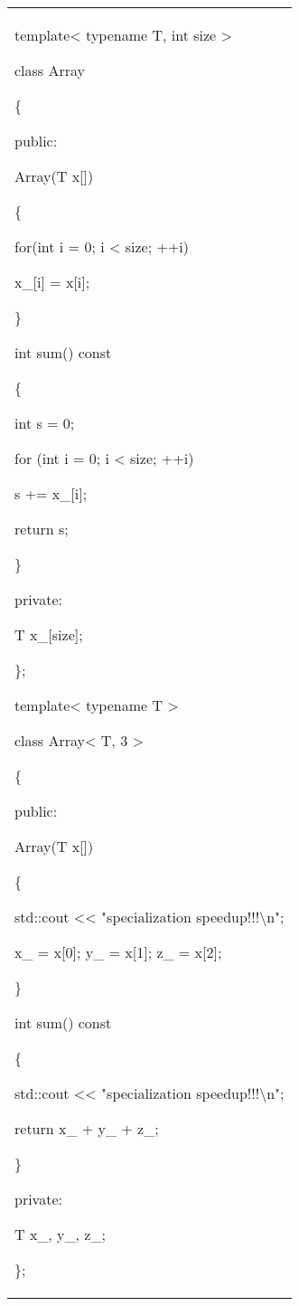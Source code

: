 \documentclass[
]{article}
\begin{document}
\begin{longtable}[]{@{}
  >{\raggedright\arraybackslash}p{}@{}}
\toprule\noalign{}
 \\
\midrule\noalign{}
\endhead
\bottomrule\noalign{}
\endlastfoot
template\textless{} typename T, int size \textgreater{}

class Array

\{

public:

Array(T x{[}{]})

\{

for(int i = 0; i \textless{} size; ++i)

x\_{[}i{]} = x{[}i{]};

\}

int sum() const

\{

int s = 0;

for (int i = 0; i \textless{} size; ++i)

s += x\_{[}i{]};

return s;

\}

private:

T x\_{[}size{]};

\};

template\textless{} typename T \textgreater{}

class Array\textless{} T, 3 \textgreater{}

\{

public:

Array(T x{[}{]})

\{

std::cout \textless\textless{} "specialization
speedup!!!\textbackslash n";

x\_ = x{[}0{]}; y\_ = x{[}1{]}; z\_ = x{[}2{]};

\}

int sum() const

\{

std::cout \textless\textless{} "specialization
speedup!!!\textbackslash n";

return x\_ + y\_ + z\_;

\}

private:

T x\_, y\_, z\_;

\}; \\
\end{longtable}
\end{document}

